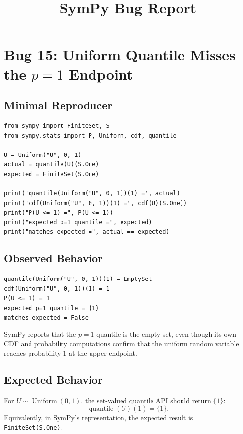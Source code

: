 \documentclass[11pt]{article}
\title{SymPy Bug Report}
\author{}
\date{}
\begin{document}
\maketitle

\section{Bug 15: Uniform Quantile Misses the \texorpdfstring{\(p = 1\)}{p = 1} Endpoint}

\subsection{Minimal Reproducer}

\medskip

\begin{lstlisting}[style=bugpython]
from sympy import FiniteSet, S
from sympy.stats import P, Uniform, cdf, quantile

U = Uniform("U", 0, 1)
actual = quantile(U)(S.One)
expected = FiniteSet(S.One)

print('quantile(Uniform("U", 0, 1))(1) =', actual)
print('cdf(Uniform("U", 0, 1))(1) =', cdf(U)(S.One))
print("P(U <= 1) =", P(U <= 1))
print("expected p=1 quantile =", expected)
print("matches expected =", actual == expected)
\end{lstlisting}

\subsection{Observed Behavior}

\medskip

\begin{lstlisting}[style=bugpython]
quantile(Uniform("U", 0, 1))(1) = EmptySet
cdf(Uniform("U", 0, 1))(1) = 1
P(U <= 1) = 1
expected p=1 quantile = {1}
matches expected = False
\end{lstlisting}

SymPy reports that the \(p = 1\) quantile is the empty set, even though its own CDF and probability computations confirm that the uniform random variable reaches probability \(1\) at the upper endpoint.

\subsection{Expected Behavior}

For \(U \sim \operatorname{Uniform}(0,1)\), the set-valued quantile API should return \(\{1\}\):
\[
\operatorname{quantile}(U)(1) = \{1\}.
\]
Equivalently, in SymPy's representation, the expected result is \texttt{FiniteSet(S.One)}.
\end{document}

